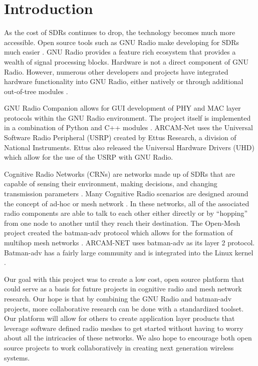 \section{Introduction}

As the cost of SDRs continues to drop, the technology becomes much more accessible. Open source tools such as GNU Radio make developing for SDRs much easier \cite{0003}. GNU Radio provides a feature rich ecosystem that provides a wealth of signal processing blocks. Hardware is not a direct component of GNU Radio. However, numerous other developers and projects have integrated hardware functionality into GNU Radio, either natively or through additional out-of-tree modules \cite{0004} \cite{0005}.

GNU Radio Companion allows for GUI development of PHY and MAC layer protocols within the GNU Radio environment. The project itself is implemented in a combination of Python and C++ modules \cite{0003}. ARCAM-Net uses the Universal Software Radio Peripheral (USRP) created by Ettus Research, a division of National Instruments\cite{0006}. Ettus also released the Universal Hardware Drivers (UHD) \cite{0007} which allow for the use of the USRP with GNU Radio.   

Cognitive Radio Networks (CRNs) are networks made up of SDRs that are capable of sensing their environment, making decisions, and changing transmission parameters \cite{Akyildiz2007921}. Many Cognitive Radio scenarios are designed around the concept of ad-hoc or mesh network \cite{Akyildiz2009810}. In these networks, all of the associated radio components are able to talk to each other either directly or by ``hopping'' from one node to another until they reach their destination. The Open-Mesh project created the batman-adv protocol which allows for the formation of multihop mesh networks \cite{0008}. ARCAM-NET uses batman-adv as its layer 2 protocol. Batman-adv has a fairly large community and is integrated into the Linux kernel \cite{0008}. 

Our goal with this project was to create a low cost, open source platform that could serve as a basis for future projects in cognitive radio and mesh network research. Our hope is that by combining the GNU Radio and batman-adv projects, more collaborative research can be done with a standardized toolset. Our platform will allow for others to create application layer products that leverage software defined radio meshes to get started without having to worry about all the intricacies of these networks. We also hope to encourage both open source projects to work collaboratively in creating next generation wireless systems. 
